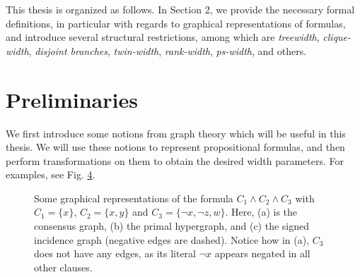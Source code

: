 \documentclass{article}
\begin{document}
This thesis is organized as follows.
In Section 2, we provide the necessary formal definitions, in particular with regards to graphical representations of formulas, and introduce several structural restrictions, among which are {\em treewidth}, {\em clique-width}, {\em disjoint branches}, {\em twin-width}, {\em rank-width}, {\em ps-width}, and others.

\section{Preliminaries}

We first introduce some notions from graph theory which will be useful in this thesis.
We will use these notions to represent propositional formulas, and then perform transformations on them to obtain the desired width parameters.
For examples, see Fig. \ref{fig:graphs}.\\

\begin{figure}
	\centering
	\begin{subfigure}[b]{0.22\textwidth}
		
		\caption{}
		\label{fig:consensus}
	\end{subfigure}
	\begin{subfigure}[b]{0.38\textwidth}
		
		\caption{}
		\label{fig:hypergraph}
	\end{subfigure}
	\begin{subfigure}[b]{0.3\textwidth}
		
		\caption{}
		\label{fig:trigraph}
	\end{subfigure}
	\caption{
		Some graphical representations of the formula $C_1 \land C_2 \land C_3$ with $C_1 = \{x\}$, $C_2 = \{x,y\}$ and $C_3=\{\neg x, \neg z, w\}$.
		Here, (a) is the consensus graph, (b) the primal hypergraph, and (c) the signed incidence graph (negative edges are dashed).
		Notice how in (a), $C_3$ does not have any edges, as its literal $\neg x$ appears negated in all other clauses.
	}
	\label{fig:graphs}
\end{figure}
\end{document}

